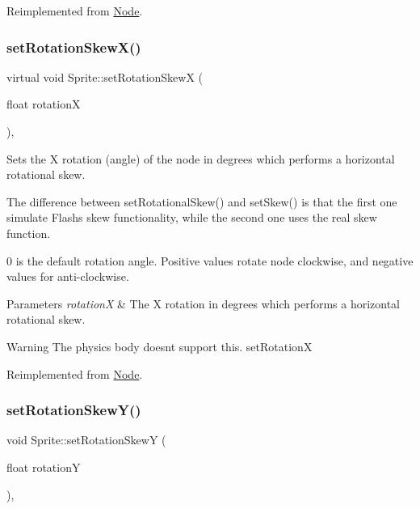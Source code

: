 Reimplemented from \hyperlink{classNode_a66a533225994dbfe125c3421df4cbb38}{Node}.

\mbox{\label{classSprite_adcc286e6eb86f3fd6242de9cdf321301}} 
\subsubsection{\texorpdfstring{set\+Rotation\+Skew\+X()}{setRotationSkewX()}\hspace{0.1cm}{\footnotesize\ttfamily [2/2]}}
{\footnotesize\ttfamily virtual void Sprite\+::set\+Rotation\+SkewX (\begin{DoxyParamCaption}\item[{float}]{rotationX }\end{DoxyParamCaption})\hspace{0.3cm}{\ttfamily [override]}, {\ttfamily [virtual]}}

Sets the X rotation (angle) of the node in degrees which performs a horizontal rotational skew.

The difference between {\ttfamily set\+Rotational\+Skew()} and {\ttfamily set\+Skew()} is that the first one simulate Flash\textquotesingle{}s skew functionality, while the second one uses the real skew function.

0 is the default rotation angle. Positive values rotate node clockwise, and negative values for anti-\/clockwise.


\begin{DoxyParams}{Parameters}
{\em rotationX} & The X rotation in degrees which performs a horizontal rotational skew.\\
\hline
\end{DoxyParams}
\begin{DoxyWarning}{Warning}
The physics body doesn\textquotesingle{}t support this.  set\+RotationX 
\end{DoxyWarning}


Reimplemented from \hyperlink{classNode_a66a533225994dbfe125c3421df4cbb38}{Node}.

\mbox{\label{classSprite_a7ed528b143e0a099f143bc1dbb39cdb1}} 
\subsubsection{\texorpdfstring{set\+Rotation\+Skew\+Y()}{setRotationSkewY()}\hspace{0.1cm}{\footnotesize\ttfamily [1/2]}}
{\footnotesize\ttfamily void Sprite\+::set\+Rotation\+SkewY (\begin{DoxyParamCaption}\item[{float}]{rotationY }\end{DoxyParamCaption})\hspace{0.3cm}{\ttfamily [override]}, {\ttfamily [virtual]}}

